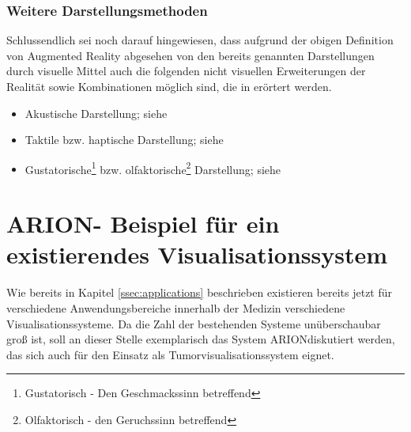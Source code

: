 \documentclass[pdftex,a4paper,titlepage,12pt]{scrartcl}
\newtheorem[L]{boxedDefinition}{Definition}
\begin{document}
\subsubsection{Weitere Darstellungsmethoden}
Schlussendlich sei noch darauf hingewiesen, dass aufgrund der obigen Definition von Augmented Reality abgesehen von den bereits genannten Darstellungen durch visuelle Mittel auch die folgenden nicht visuellen Erweiterungen der Realität sowie Kombinationen möglich sind, die in \cite[Kapitel 2.4, Seite 36-41]{Toe2010} erörtert werden. 
\begin{itemize}
 \item Akustische Darstellung; siehe \cite[Seite 37]{Toe2010}
 \item Taktile bzw. haptische Darstellung; siehe \cite[Seite 38f.]{Toe2010}
 \item Gustatorische\footnote{Gustatorisch - Den Geschmackssinn betreffend} bzw. olfaktorische\footnote{Olfaktorisch - den Geruchssinn betreffend} Darstellung; siehe \cite[Seite 39-41]{Toe2010}
\end{itemize}

\section{ARION\texttrademark - Beispiel für ein existierendes Visualisationssystem}\label{sec:arion}
Wie bereits in Kapitel \vref{ssec:applications} beschrieben existieren bereits jetzt für verschiedene Anwendungsbereiche innerhalb der Medizin verschiedene Visualisationssysteme. Da die Zahl der bestehenden Systeme unüberschaubar groß ist, soll an dieser Stelle exemplarisch das System ARION\texttrademark diskutiert werden, das sich auch für den Einsatz als Tumorvisualisationssystem eignet.
\end{document}
